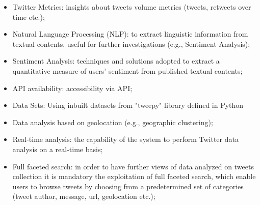 \documentclass[preprint,12pt]{elsarticle}
\begin{document}
\begin{itemize}
\item Twitter Metrics: insights about tweets volume metrics (tweets, retweets over time etc.); \\
\item Natural Language Processing (NLP): to extract linguistic information from textual contents, useful for further investigations (e.g., Sentiment Analysis);\\
\item Sentiment Analysis: techniques and solutions adopted to extract a quantitative measure of users’ sentiment from published textual contents; \\
\item API availability: accessibility via API;\\ 
\item Data Sets: Using inbuilt datasets from "tweepy" library defined in Python \\
\item Data analysis based on geolocation (e.g., geographic clustering); \\
\item Real-time analysis: the capability of the system to perform Twitter data analysis on a real-time basis; \\
\item Full faceted search: in order to have further views of data analyzed on tweets collection it is mandatory the exploitation of full faceted search, which enable users to browse tweets by choosing from a predetermined set of categories (tweet author, message, url, geolocation etc.);\\
\end{itemize}
\end{document}
